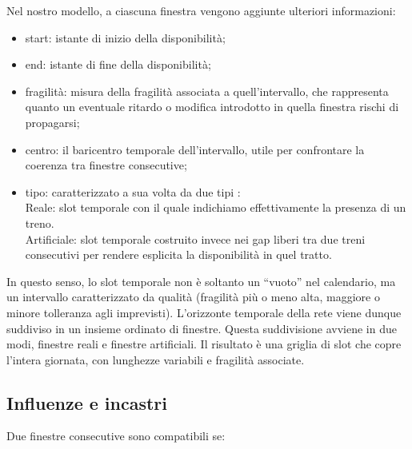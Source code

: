 \documentclass[a4paper,12pt]{report}
\begin{document}
Nel nostro modello, a ciascuna finestra vengono aggiunte ulteriori informazioni:

\begin{itemize}
 \item start: istante di inizio della disponibilità;


 \item end: istante di fine della disponibilità;

 \item fragilità: misura della fragilità associata a quell’intervallo, che rappresenta quanto un eventuale ritardo o modifica introdotto in quella finestra rischi di propagarsi;

 \item centro: il baricentro temporale dell’intervallo, utile per confrontare la coerenza tra finestre consecutive;

 \item tipo: caratterizzato a sua volta da due tipi : \\
  Reale: slot temporale con il quale indichiamo effettivamente la presenza di un treno. \\
  Artificiale: slot temporale costruito invece nei gap liberi tra due treni consecutivi per rendere esplicita la disponibilità in quel tratto.

\end{itemize} 
In questo senso, lo slot temporale non è soltanto un “vuoto” nel calendario, ma un intervallo caratterizzato da qualità (fragilità più o meno alta, maggiore o minore tolleranza agli imprevisti).
L’orizzonte temporale della rete viene dunque suddiviso in un insieme ordinato di finestre. 
Questa suddivisione avviene in due modi, finestre reali e finestre artificiali.
Il risultato è una griglia di slot che copre l’intera giornata, con lunghezze variabili e fragilità associate.



\subsection{Influenze e incastri}

Due finestre consecutive sono compatibili se:
\end{document}
